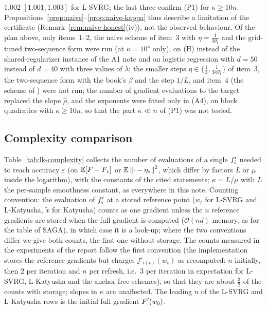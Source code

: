 $1.002$ $[1.001,1.003]$ for L-SVRG; the last three confirm (P1) for $\kappa\ge10n$. Propositions~\ref{prop:naive}--\ref{prop:naive-kappa} thus describe a limitation of the certificate (Remark~\ref{rem:naive-honest}(iv)), not the observed behaviour. Of the plan above, only items~1--2, the naive scheme of item~3 with $\eta=\frac1{3\theta_1}$ and the grid-tuned two-sequence form were run (at $\kappa=10^4$ only), on (H) instead of the shared-regularizer instance of the A1 note and on logistic regression with $d=50$ instead of $d=40$ with three values of $\lambda$; the smaller steps $\eta\in\{\frac13,\frac1{3\kappa\theta_1}\}$ of item~3, the two-sequence form with the book's $\beta$ and the step $1/L$, and item~4 (the scheme of \cite{driggs2022accelerating}) were not run; the number of gradient evaluations to the target replaced the slope $\hat\rho$, and the exponents were fitted only in (A4), on block quadratics with $\kappa\ge10n$, so that the part $\kappa\ll n$ of (P1) was not tested.

\subsection{Complexity comparison}
\label{sec:lk-complexity-table}

Table~\ref{tab:lk-complexity} collects the number of evaluations of a single $f'_i$ needed to reach accuracy $\varepsilon$ (on $\mathbb{E}[F-F_\ast]$ or $\mathbb{E}\left\|\cdot-\eta_\ast\right\|^2$, which differ by factors $L$ or $\mu$ inside the logarithm), with the constants of the cited statements; $\kappa=L/\mu$ with $L$ the per-sample smoothness constant, as everywhere in this note. Counting convention: the evaluation of $f'_i$ at a stored reference point ($w_t$ for L-SVRG and L-Katyusha, $\tilde x$ for Katyusha) counts as one gradient unless the $n$ reference gradients are stored when the full gradient is computed ($\mathcal O(nd)$ memory, as for the table of SAGA), in which case it is a look-up; where the two conventions differ we give both counts, the first one without storage. The counts measured in the experiments of the report follow the first convention (the implementation stores the reference gradients but charges $f'_{i(t)}(w_t)$ as recomputed: $n$ initially, then $2$ per iteration and $n$ per refresh, i.e.\ $3$ per iteration in expectation for L-SVRG, L-Katyusha and the anchor-free schemes), so that they are about $\frac32$ of the counts with storage; slopes in $\kappa$ are unaffected. The leading $n$ of the L-SVRG and L-Katyusha rows is the initial full gradient $F'(w_0)$.

